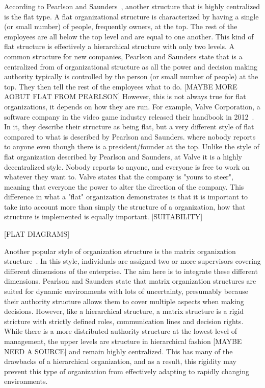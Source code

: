 According to Pearlson and Saunders~\cite{pearlson2009}, another structure that is highly centralized is the flat type. A flat organizational structure is characterized by having a single (or small number) of people, frequently owners, at the top. The rest of the employees are all below the top level and are equal to one another. This kind of flat structure is effectively a hierarchical structure with only two levels. A common structure for new companies, Pearlson and Saunders state that is a centralized from of organizational structure as all the power and decision making authority typically is controlled by the person (or small number of people) at the top. They then tell the rest of the employees what to do. [MAYBE MORE AOBUT FLAT FROM PEARLSON] However, this is not always true for flat organizations, it depends on how they are run. For example, Valve Corporation, a software company in the video game industry released their handbook in 2012~\cite{valveHandbook}. In it, they describe their structure as being flat, but a very different style of flat compared to what is described by Pearlson and Saunders. where nobody reports to anyone even though there is a president/founder at the top. Unlike the style of flat organization described by Pearlson and Saunders, at Valve it is a highly decentralized style. Nobody reports to anyone, and everyone is free to work on whatever they want to. Valve states that the company is "yours to steer", meaning that everyone the power to alter the direction of the company. This difference in what a "flat" organization demonstrates is that it is important to take into account more than simply the structure of a organization, how that structure is implemented is equally important. 
[SUITABILITY]

[FLAT DIAGRAMS]

Another popular style of organization structure is the matrix organization structure~\cite{pearlson2009}. In this style, individuals are assigned two or more supervisors covering different dimensions of the enterprise. The aim here is to integrate these different dimensions. Pearlson and Saunders state that matrix organization structures are suited for dynamic environments with lots of uncertainty, presumably because their authority structure allows them to cover multiple aspects when making decisions. However, like a hierarchical structure, a matrix structure is a rigid stricture with strictly defined roles, communication lines and decision rights. While there is a more distributed authority structure at the lowest level of management, the upper levels are structure in hierarchical fashion [MAYBE NEED A SOURCE] and remain highly centralized. This has many of the drawbacks of a hierarchical organization, and as a result, this rigidity may prevent this type of organization from effectively adapting to rapidly changing environments. 

